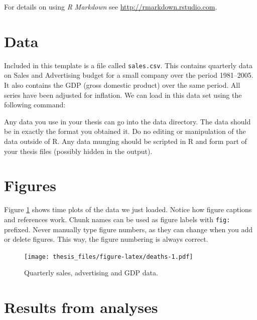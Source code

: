 \documentclass{monashthesis}
\begin{document}
For details on using \emph{R Markdown} see \url{http://rmarkdown.rstudio.com}.

\hypertarget{data}{%
\section{Data}\label{data}}

Included in this template is a file called \texttt{sales.csv}. This contains quarterly data on Sales and Advertising budget for a small company over the period 1981--2005. It also contains the GDP (gross domestic product) over the same period. All series have been adjusted for inflation. We can load in this data set using the following command:

\begin{Shaded}
\begin{Highlighting}[]
\StringTok{ }\NormalTok{(}\NormalTok{(}\NormalTok{)[,}\OperatorTok{-}\NormalTok{], }\NormalTok{, }\NormalTok{)}
\end{Highlighting}
\end{Shaded}

Any data you use in your thesis can go into the data directory. The data should be in exactly the format you obtained it. Do no editing or manipulation of the data outside of R. Any data munging should be scripted in R and form part of your thesis files (possibly hidden in the output).

\hypertarget{figures}{%
\section{Figures}\label{figures}}

Figure \ref{fig:deaths} shows time plots of the data we just loaded. Notice how figure captions and references work. Chunk names can be used as figure labels with \texttt{fig:} prefixed. Never manually type figure numbers, as they can change when you add or delete figures. This way, the figure numbering is always correct.

\begin{figure}
\centering
\texttt{[image: thesis\_files/figure-latex/deaths-1.pdf]}
\caption{\label{fig:deaths}Quarterly sales, advertising and GDP data.}
\end{figure}

\hypertarget{results-from-analyses}{%
\section{Results from analyses}\label{results-from-analyses}}
\end{document}

